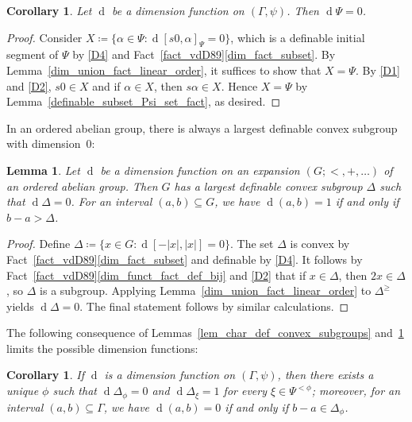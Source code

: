 \documentclass[11pt]{amsart}
\theoremstyle{plain}
\newtheorem{lemma}[thm]{Lemma}
\newtheorem{cor}[thm]{Corollary}
\theoremstyle{definition}
\numberwithin{equation}{section}
\newcommand\0{\varnothing}
\renewcommand\d{\operatorname{d}}
\begin{document}
\begin{cor}\label{cor_dPsi0}
Let $\operatorname{d}$ be a dimension function on $(\Gamma,\psi)$. Then $\operatorname{d}\Psi=0$.
\end{cor}
\begin{proof}
Consider $X\coloneqq\{\alpha \in \Psi:\d[s0,\alpha]_{\Psi}=0\}$, which is a definable initial segment of $\Psi$ by \ref{D4} and Fact~\ref{fact_vdD89}\eqref{dim_fact_subset}.
By Lemma~\ref{dim_union_fact_linear_order}, it suffices to show that $X=\Psi$.
By \ref{D1} and \ref{D2}, $s0 \in X$ and if $\alpha \in X$, then $s\alpha \in X$.
Hence $X=\Psi$ by Lemma~\ref{definable_subset_Psi_set_fact}, as desired.
\end{proof}

\noindent
In an ordered abelian group, there is always a largest definable convex subgroup with dimension~$0$:


\begin{lemma}\label{lem_odag_convex_dim_fact}
Let $\d$ be a dimension function on an expansion $(G;<,+,\ldots)$ of an ordered  abelian group.
Then $G$ has a largest definable convex subgroup $\Delta$ such that $\d\Delta=0$.
For an interval $(a,b)\subseteq G$, we have $\d(a,b)=1$ if and only if $b-a>\Delta$.
\end{lemma}
\begin{proof}
Define $\Delta\coloneqq\{ x \in G : \d[-|x|,|x|]=0 \}$.
The set $\Delta$ is convex by Fact~\ref{fact_vdD89}\eqref{dim_fact_subset} and definable by \ref{D4}.
It follows by Fact~\ref{fact_vdD89}\eqref{dim_funct_fact_def_bij} and \ref{D2} that if $x \in \Delta$, then $2x\in\Delta$, so $\Delta$ is a subgroup.
Applying Lemma~\ref{dim_union_fact_linear_order} to $\Delta^{\geq}$ yields $\d\Delta=0$.
The final statement follows by similar calculations.
\end{proof}

\noindent
The following consequence of Lemmas~\ref{lem_char_def_convex_subgroups} and~\ref{lem_odag_convex_dim_fact} limits the possible dimension functions:

\begin{cor}\label{cor_dphiwide}
If $\operatorname{d}$ is a dimension function on $(\Gamma,\psi)$, then there exists a unique $\phi$ such that $\operatorname{d}\Delta_{\phi}=0$ and $\operatorname{d}\Delta_{\xi}=1$ for every $\xi\in\Psi^{<\phi}$; moreover, for an interval $(a,b)\subseteq\Gamma$, we have $\operatorname{d}(a,b)=0$ if and only if $b-a\in\Delta_{\phi}$.
\end{cor}
\end{document}
